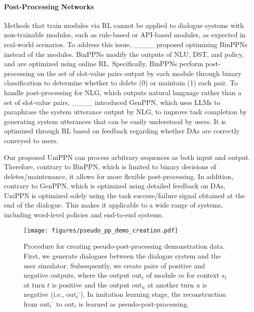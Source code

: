 \paragraph{Post-Processing Networks}
Methods that train modules via RL cannot be applied to dialogue systems with non-trainable modules, such as rule-based or API-based modules, as expected in real-world scenarios. To address this issue, ____ proposed optimizing BinPPNs instead of the modules. BinPPNs modify the outputs of NLU, DST, and policy, and are optimized using online RL. Specifically, BinPPNs perform post-processing on the set of slot-value pairs output by each module through binary classification to determine whether to delete (0) or maintain (1) each pair. To handle post-processing for NLG, which outputs natural language rather than a set of slot-value pairs, ____ introduced GenPPN, which uses LLMs to paraphrase the system utterance output by NLG, to improve task completion by generating system utterances that can be easily understood by users. It is optimized through RL based on  feedback regarding whether DAs are correctly conveyed to users.

Our proposed UniPPN can process arbitrary sequences as both input and output. Therefore, contrary to BinPPN, which is limited to binary decisions of deletes/maintenance, it allows for more flexible post-processing. In addition, contrary to GenPPN, which is optimized using detailed feedback on DAs, UniPPN is optimized solely using the task success/failure signal obtained at the end of the dialogue. This makes it applicable to a wide range of systems, including word-level policies and end-to-end systems.

\begin{figure*}
\centering
\texttt{[image: figures/pseudo\_pp\_demo\_creation.pdf]}
\caption{Procedure for creating pseudo-post-processing demonstration data. First, we generate dialogues between the dialogue system and the user simulator. Subsequently, we create pairs of positive and negative outputs, where the output $\text{out}_t$ of module $m$ for context $s_t$ at turn $t$ is positive and the output $\text{out}_u$ at another turn $u$ is negative (i.e., $\text{out}_t^-$). In imitation learning stage, the reconstruction from $\text{out}_t^-$ to $\text{out}_t$ is learned as pseudo-post-processing.}
\label{fig:pseudo_pp_demo_creation}
\end{figure*}
